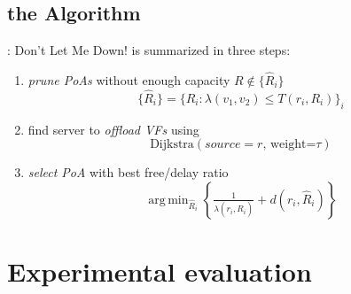 \documentclass[aspectratio=169,dvipsnames]{beamer}
\DeclareMathOperator*{\argmin}{arg\,min}
\begin{document}
\subsection{the Algorithm}
\begin{frame}{\secname: \subsecname}
    Don't Let Me Down! is summarized in three steps:
    \begin{enumerate}
        \item \emph{prune PoAs} without enough capacity $R\notin\{\hat{R}_i\}$
            \begin{equation}
                \{\hat{R}_i\} = \{R_i: \lambda(v_1,v_2) \leq T(r_i, R_i)\}_i
            \end{equation}
        \item find server to \emph{offload VFs} using
            \begin{equation}
                \text{Dijkstra}({source=}r\text{, weight=}\tau)
            \end{equation}
        \item \emph{select PoA} with best free/delay ratio
            \begin{equation}
                \argmin_{\hat{R}_i} \left\{\tfrac{1}{\lambda(r_i,\hat{R}_i)}+d(r_i,\hat{R}_i) \right\}
            \end{equation}
    \end{enumerate}
\end{frame}


\newcommand{\delaytab}{%
    \begin{tabular}{c l l l }
        \toprule
         {\bf PoA} & {\bf Cloud} & {\bf  fEdge} & {\bf\ nEdge} \\ 
        \midrule
        R\textsubscript{1}, R\textsubscript{3} & 9~ms & 4~ms & 3~ms\\
       R\textsubscript{2}, R\textsubscript{4} & 18~ms & 8~ms & 9~ms\\
       R\textsubscript{5}, R\textsubscript{6} & 27~ms & 12~ms & 9~ms\\
       \bottomrule
    \end{tabular}
}

\section{Experimental evaluation}
\end{document}
